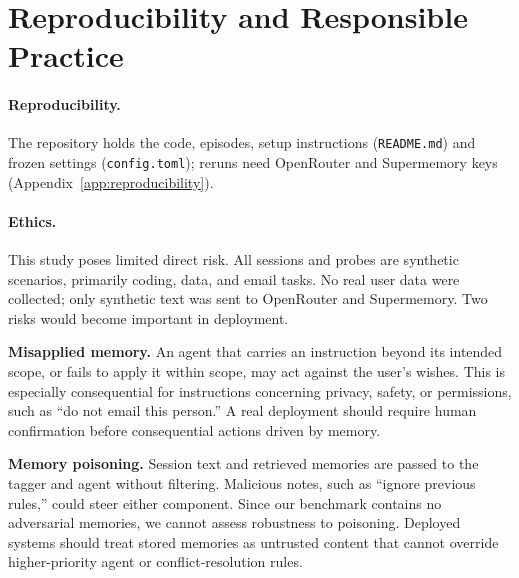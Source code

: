 \section{Reproducibility and Responsible Practice}
\label{sec:reproducibility}

\paragraph{Reproducibility.}
The repository holds the code, episodes, setup
instructions (\texttt{README.md}) and frozen settings
(\texttt{config.toml}); reruns need OpenRouter and
Supermemory keys (Appendix~\ref{app:reproducibility}).

\paragraph{Ethics.}
This study poses limited direct risk. All sessions and
probes are synthetic scenarios, primarily coding, data,
and email tasks. No real user data were collected; only
synthetic text was sent to OpenRouter and Supermemory.
Two risks would become important in deployment.

\textbf{Misapplied memory.} An agent that carries an
instruction beyond its intended scope, or fails to apply
it within scope, may act against the user's wishes. This
is especially consequential for instructions concerning
privacy, safety, or permissions, such as ``do not email
this person.'' A real deployment should require human
confirmation before consequential actions driven by memory.

\textbf{Memory poisoning.} Session text and retrieved
memories are passed to the tagger and agent without
filtering. Malicious notes, such as ``ignore previous
rules,'' could steer either component. Since our benchmark
contains no adversarial memories, we cannot assess
robustness to poisoning. Deployed systems should treat
stored memories as untrusted content that cannot override
higher-priority agent or conflict-resolution rules.

